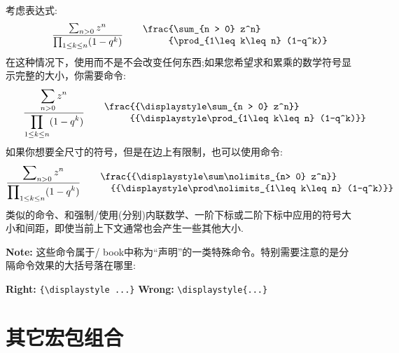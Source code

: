 考虑表达式:
\[\frac{\sum_{n > 0} z^n}{\prod_{1\leq k\leq n} (1-q^k)}
\qquad\begin{minipage}{.5\columnwidth}
\begin{verbatim}
\frac{\sum_{n > 0} z^n}
     {\prod_{1\leq k\leq n} (1-q^k)}
\end{verbatim}
\end{minipage}
\]
在这种情况下，使用而不是不会改变任何东西;如果您希望求和累乘的数学符号显示完整的大小，你需要命令:
\[
\frac{{\displaystyle\sum_{n > 0} z^n}}
     {{\displaystyle\prod_{1\leq k\leq n} (1-q^k)}}
\qquad\begin{minipage}{.7\columnwidth}
\begin{verbatim}
\frac{{\displaystyle\sum_{n > 0} z^n}}
     {{\displaystyle\prod_{1\leq k\leq n} (1-q^k)}}
\end{verbatim}
\end{minipage}
\]
如果你想要全尺寸的符号，但是在边上有限制，也可以使用命令:
\[
\frac{{\displaystyle\sum\nolimits_{n> 0} z^n}}
  {{\displaystyle\prod\nolimits_{1\leq k\leq n} (1-q^k)}}
\qquad\begin{minipage}{.76\columnwidth}
\begin{verbatim}
\frac{{\displaystyle\sum\nolimits_{n> 0} z^n}}
  {{\displaystyle\prod\nolimits_{1\leq k\leq n} (1-q^k)}}
\end{verbatim}
\end{minipage}
\]
类似的命令、和强制\lat/使用(分别)内联数学、一阶下标或二阶下标中应用的符号大小和间距，即使当前上下文通常也会产生一些其他大小.

\textbf{Note:} 这些命令属于\lat/ book中称为“声明”的一类特殊命令。特别需要注意的是分隔命令效果的大括号落在哪里:
\begin{center}
\textbf{Right: } \verb'{\displaystyle ...}'
\qquad\qquad\textbf{Wrong: } \verb'\displaystyle{...}'
\end{center}


\section{其它宏包组合}
\label{other-packages}


